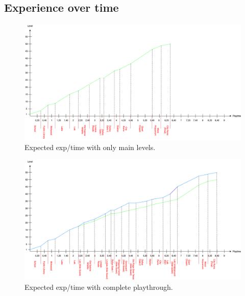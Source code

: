 \subsection{Experience over time}

\begin{figure}[H]
	\centering
	\includegraphics[width=1.2\linewidth]{images/graphs/basic_graph_exp.png}
	\caption*{Expected exp/time with only main levels.}
\end{figure}



\begin{figure}[H]
	\centering
	\includegraphics[width=1.2\linewidth]{images/graphs/full_graph_exp.png}
	\caption*{Expected exp/time with complete playthrough.}
\end{figure}